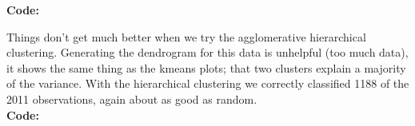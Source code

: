 \documentclass[12pt]{article}
\makeatletter
\theoremstyle{homework}
\newenvironment{exercise}[1]
{\def\@currentlabel{#1}\exercisecore}
{\endexercisecore}
\makeatother
\begin{document}
\begin{exercise}{5}
\begin{figure}[H]
\begin{center}
  \end{center}
\end{figure}
\textbf{Code:}
\begin{center}

\end{center}

Things don't get much better when we try the agglomerative hierarchical clustering. Generating the dendrogram for this data is unhelpful (too much data), it shows the same thing as 
the kmeans plots; that two clusters explain a majority of the variance. With the hierarchical clustering we correctly classified 1188 of the 2011 observations, again about as good as random. \\
\textbf{Code:}
\begin{center}

\end{center}
\end{exercise}
\end{document}
